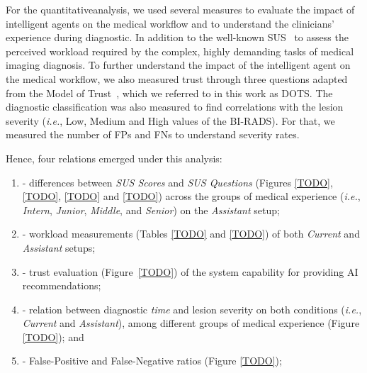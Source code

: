 For the quantitative\footnotemark[23] analysis, we used several measures to evaluate the impact of intelligent agents on the medical workflow and to understand the clinicians' experience during diagnostic.
In addition to the well-known \ac{SUS}~\cite{Tyllinen:2016:WNN:2858036.2858570} to assess the perceived workload required by the complex, highly demanding tasks of medical imaging diagnosis.
To further understand the impact of the intelligent agent on the medical workflow, we also measured trust through three questions adapted from the Model of Trust~\cite{schoorman2016perspective}, which we referred to in this work as \ac{DOTS}.
The diagnostic classification was also measured to find correlations with the lesion severity ({\it i.e.}, Low, Medium and High values of the BI-RADS).
For that, we measured the number of \acfp{FP} and \acfp{FN} to understand severity rates.


\vspace{1.5mm}

\noindent
Hence, four relations emerged under this analysis:

\vspace{0.5mm}

\begin{enumerate}[label=\alph*]
\item - differences between {\it \ac{SUS} Scores} and {\it \ac{SUS} Questions} (Figures \ref{TODO}, \ref{TODO}, \ref{TODO} and \ref{TODO}) across the groups of medical experience ({\it i.e.}, {\it Intern}, {\it Junior}, {\it Middle}, and {\it Senior}) on the {\it Assistant} setup;
\item - workload measurements (Tables \ref{TODO} and \ref{TODO}) of both {\it Current} and {\it Assistant} setups;
\item - trust evaluation (Figure~\ref{TODO}) of the system capability for providing \ac{AI} recommendations;
\item - relation between diagnostic {\it time} and lesion severity on both conditions ({\it i.e.}, {\it Current} and {\it Assistant}), among different groups of medical experience (Figure \ref{TODO}); and
\item - False-Positive and False-Negative ratios (Figure \ref{TODO});
\end{enumerate}

